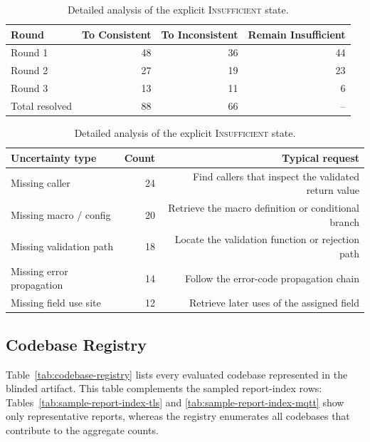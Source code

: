 \begin{table}[t]
\centering
\caption{Detailed analysis of the explicit \textsc{Insufficient} state.}
\label{tab:insufficient-analysis}
\small
\begin{tabular}{lrrr}
\toprule
\textbf{Round} & \textbf{To Consistent} & \textbf{To Inconsistent} & \textbf{Remain Insufficient} \\
\midrule
Round 1 & 48 & 36 & 44 \\
Round 2 & 27 & 19 & 23 \\
Round 3 & 13 & 11 & 6 \\
\midrule
Total resolved & 88 & 66 & -- \\
\bottomrule
\end{tabular}

\vspace{1em}

\begin{tabular}{lrr}
\toprule
\textbf{Uncertainty type} & \textbf{Count} & \textbf{Typical request} \\
\midrule
Missing caller & 24 & Find callers that inspect the validated return value \\
Missing macro / config & 20 & Retrieve the macro definition or conditional branch \\
Missing validation path & 18 & Locate the validation function or rejection path \\
Missing error propagation & 14 & Follow the error-code propagation chain \\
Missing field use site & 12 & Retrieve later uses of the assigned field \\
\bottomrule
\end{tabular}
\end{table}

\subsection{Codebase Registry}

Table~\ref{tab:codebase-registry} lists every evaluated codebase represented in
the blinded artifact. This table complements the sampled report-index rows:
Tables~\ref{tab:sample-report-index-tls} and
\ref{tab:sample-report-index-mqtt} show only representative reports, whereas
the registry enumerates all codebases that contribute to the aggregate counts.

